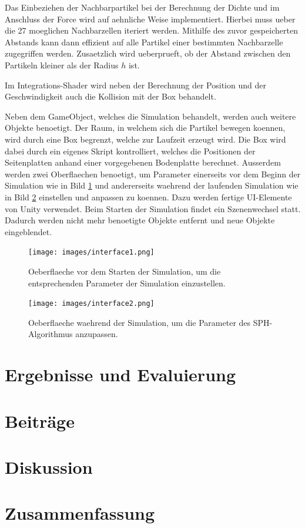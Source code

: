 \documentclass[a4paper]{paper}
\begin{document}
Das Einbeziehen der Nachbarpartikel bei der Berechnung der Dichte und im Anschluss der Force wird auf aehnliche Weise implementiert. Hierbei muss ueber die 27 moeglichen Nachbarzellen iteriert werden. Mithilfe des zuvor gespeicherten Abstands kann dann effizient auf alle Partikel einer bestimmten Nachbarzelle zugegriffen werden. Zusaetzlich wird ueberprueft, ob der Abstand zwischen den Partikeln kleiner als der Radius $h$ ist.

Im Integrations-Shader wird neben der Berechnung der Position und der Geschwindigkeit auch die Kollision mit der Box behandelt.

Neben dem GameObject, welches die Simulation behandelt, werden auch weitere Objekte benoetigt. Der Raum, in welchem sich die Partikel bewegen koennen, wird durch eine Box begrenzt, welche zur Laufzeit erzeugt wird. Die Box wird dabei durch ein eigenes Skript kontrolliert, welches die Positionen der Seitenplatten anhand einer vorgegebenen Bodenplatte berechnet.
Ausserdem werden zwei Oberflaechen benoetigt, um Parameter einerseits vor dem Beginn der Simulation wie in Bild \ref{fig:interface1} und andererseits waehrend der laufenden Simulation wie in Bild \ref{fig:interface2} einstellen und anpassen zu koennen. Dazu werden fertige UI-Elemente von Unity verwendet. Beim Starten der Simulation findet ein Szenenwechsel statt. Dadurch werden nicht mehr benoetigte Objekte entfernt und neue Objekte eingeblendet.

\begin{figure}[t]
    \centering
    \texttt{[image: images/interface1.png]}
    \caption{Oeberflaeche vor dem Starten der Simulation, um die entsprechenden Parameter der Simulation einzustellen.}
    \label{fig:interface1}
\end{figure}

\begin{figure}[t]
    \centering
    \texttt{[image: images/interface2.png]}
    \caption{Oeberflaeche waehrend der Simulation, um die Parameter des SPH-Algorithmus anzupassen.}
    \label{fig:interface2}
\end{figure}

\section{Ergebnisse und Evaluierung}

\section{Beiträge}

\section{Diskussion}

\section{Zusammenfassung}



\end{document}
